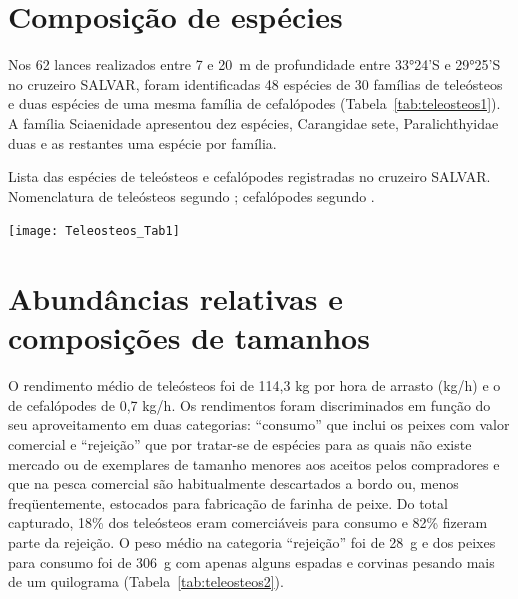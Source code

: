 \documentclass[a4paper,11pt,twoside,showtrims,onecolumn,openright,final]{memoir}
\begin{document}
\newpage

\section*{Composição de espécies}

Nos 62 lances realizados entre 7 e 20~m de profundidade entre 33°24'S e 29°25'S no 
cruzeiro SALVAR, foram identificadas 48 espécies de 30 famílias de teleósteos e duas espécies 
de uma mesma família de cefalópodes (Tabela~\ref{tab:teleosteos1}). 
A família Sciaenidade apresentou dez espécies, Carangidae sete, Paralichthyidae duas 
e as restantes uma espécie por família.


%
%

\begin{table}[b]
\caption[Lista das espécies de teleósteos e cefalópodes registradas no cruzeiro SALVAR]
	{Lista das espécies de teleósteos e cefalópodes registradas no cruzeiro SALVAR. 
         Nomenclatura de teleósteos segundo \citet{buckup2003}; 
         cefalópodes segundo \citet{HAIMOVICI1994A}.}
\label{tab:teleosteos1}
\begin{center}
\texttt{[image: Teleosteos\_Tab1]}
\end{center}
\end{table}


\section*{Abundâncias relativas e composições de tamanhos}

O rendimento médio de teleósteos foi de 114,3 kg por hora de arrasto (kg/h) e 
o de cefalópodes de 0,7 kg/h. Os rendimentos foram discriminados em função do seu aproveitamento 
em duas categorias: ``consumo'' que inclui os peixes com valor comercial e ``rejeição'' que por tratar-se 
de espécies para as quais não existe mercado ou de exemplares de tamanho menores aos aceitos pelos compradores 
e que na pesca comercial são habitualmente descartados a bordo ou, menos freqüentemente, estocados para 
fabricação de farinha de peixe. Do total capturado, 18\% dos teleósteos eram comerciáveis para consumo 
e 82\% fizeram parte da rejeição. O peso médio na categoria ``rejeição'' foi de 28~g e dos peixes para consumo 
foi de 306~g com apenas alguns espadas e corvinas pesando mais de um quilograma (Tabela~\ref{tab:teleosteos2}). 
\end{document}
